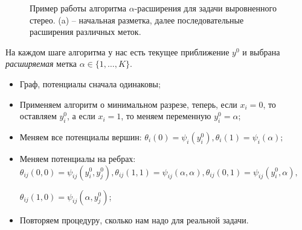 \begin{figure}[H]
  \caption{Пример работы алгоритма $\alpha$-расширения для задачи
  выровненного стерео. (a) -- начальная разметка, далее последовательные
  расширения различных меток.}
\end{figure}

На каждом шаге алгоритма у нас есть текущее приближение $y^0$ и выбрана
\textit{расширяемая} метка $\alpha \in \{1, \ldots, K\}$.

\begin{itemize}
  \item Граф, потенциалы сначала одинаковы;
  \item Применяем алгоритм о минимальном разрезе, теперь, если $x_i = 0$, то
  оставляем $y_i^0$, а если $x_i = 1$, то меняем переменную $y_i^0 = \alpha$;
  \item Меняем все потенциалы вершин: $\theta_i(0) = \psi_i(y_i^0), 
  \theta_i(1) = \psi_i(\alpha);$
  \item Меняем потенциалы на ребрах: $\theta_{ij}(0, 0) = \psi_{ij}(y_i^0, y_j^0),
  \theta_{ij}(1, 1) = \psi_{ij}(\alpha, \alpha), \theta_{ij}(0, 1) =
  \psi_{ij}(y_i^0, \alpha), $
  
  $\theta_{ij}(1, 0) = \psi_{ij}(\alpha, y_j^0)$;
  \item Повторяем процедуру, сколько нам надо для реальной задачи.
\end{itemize}

% 
